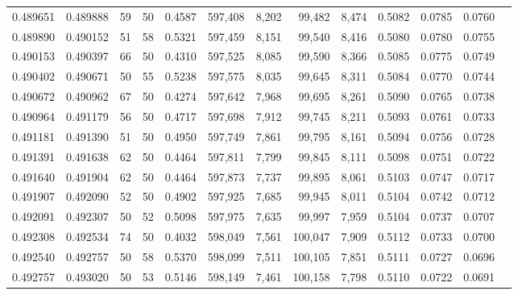 \begin{tabular}{rrrrrrrrrrrrr}
0.489651 & 0.489888 &    59 &  50 &                                     0.4587 & 597,408 &   8,202 &  99,482 &   8,474 & 0.5082 & 0.0785 & 0.0760 \\
0.489890 & 0.490152 &    51 &  58 &                                     0.5321 & 597,459 &   8,151 &  99,540 &   8,416 & 0.5080 & 0.0780 & 0.0755 \\
0.490153 & 0.490397 &    66 &  50 &                                     0.4310 & 597,525 &   8,085 &  99,590 &   8,366 & 0.5085 & 0.0775 & 0.0749 \\
0.490402 & 0.490671 &    50 &  55 &                                     0.5238 & 597,575 &   8,035 &  99,645 &   8,311 & 0.5084 & 0.0770 & 0.0744 \\
0.490672 & 0.490962 &    67 &  50 &                                     0.4274 & 597,642 &   7,968 &  99,695 &   8,261 & 0.5090 & 0.0765 & 0.0738 \\
0.490964 & 0.491179 &    56 &  50 &                                     0.4717 & 597,698 &   7,912 &  99,745 &   8,211 & 0.5093 & 0.0761 & 0.0733 \\
0.491181 & 0.491390 &    51 &  50 &                                     0.4950 & 597,749 &   7,861 &  99,795 &   8,161 & 0.5094 & 0.0756 & 0.0728 \\
0.491391 & 0.491638 &    62 &  50 &                                     0.4464 & 597,811 &   7,799 &  99,845 &   8,111 & 0.5098 & 0.0751 & 0.0722 \\
0.491640 & 0.491904 &    62 &  50 &                                     0.4464 & 597,873 &   7,737 &  99,895 &   8,061 & 0.5103 & 0.0747 & 0.0717 \\
0.491907 & 0.492090 &    52 &  50 &                                     0.4902 & 597,925 &   7,685 &  99,945 &   8,011 & 0.5104 & 0.0742 & 0.0712 \\
0.492091 & 0.492307 &    50 &  52 &                                     0.5098 & 597,975 &   7,635 &  99,997 &   7,959 & 0.5104 & 0.0737 & 0.0707 \\
0.492308 & 0.492534 &    74 &  50 &                                     0.4032 & 598,049 &   7,561 & 100,047 &   7,909 & 0.5112 & 0.0733 & 0.0700 \\
0.492540 & 0.492757 &    50 &  58 &                                     0.5370 & 598,099 &   7,511 & 100,105 &   7,851 & 0.5111 & 0.0727 & 0.0696 \\
0.492757 & 0.493020 &    50 &  53 &                                     0.5146 & 598,149 &   7,461 & 100,158 &   7,798 & 0.5110 & 0.0722 & 0.0691 \\

\end{tabular}
